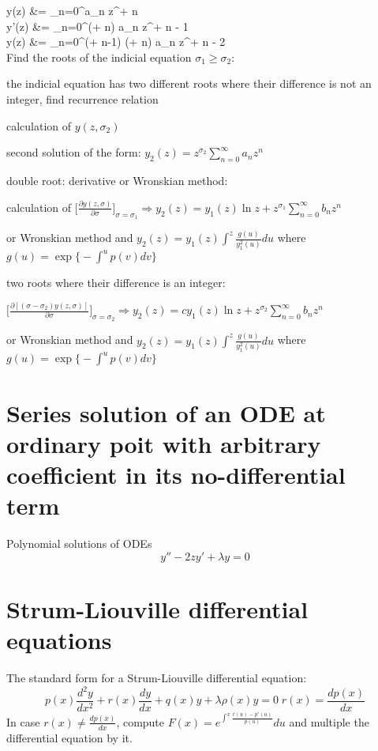\documentclass[12pt,twoside]{article}
\begin{document}
\ba
	y(z) &= \sum_{n=0}^\infty a_n z^{\sigma + n} \\
	y'(z) &= \sum_{n=0}^\infty (\sigma + n) a_n z^{\sigma + n - 1} \\
	y(z) &= \sum_{n=0}^\infty (\sigma + n-1) (\sigma + n) a_n z^{\sigma + n - 2} \\
\ea
Find the roots of the indicial equation $\sigma_1 \ge \sigma_2$:
\bi
	\item the indicial equation has two different roots where their difference is not an integer, find recurrence relation
	\bi
		\item calculation of $y(z, \sigma_2)$
		\item second solution of the form: $y_2(z) = z^{\sigma_2} \sum_{n=0}^{\infty} a_n z^n$
	\ei
	\item double root: derivative or Wronskian method: 
	\bi
		\item calculation of $\bigg [ \frac{\partial y(z,\sigma)}{ \partial \sigma} \bigg ]_{\sigma=\sigma_1} \Rightarrow y_2(z) = y_1(z) \ln z +  z^{\sigma_1} \sum_{n=0}^{\infty} b_n z^n$
		\item or Wronskian method and $y_2(z) = y_1(z) \int^z \frac{g(u)} {y_1^2(u)} du$ where $g(u) = \exp \big \{  - \int^u p(v) dv \big \}$
	\ei
	\item two roots where their difference is an integer: 
	\bi
		\item $\bigg [ \frac{\partial [ (\sigma - \sigma_2) y(z,\sigma) ]}{ \partial \sigma} \bigg ]_{\sigma=\sigma_2} \Rightarrow y_2(z) = c y_1(z) \ln z +  z^{\sigma_2} \sum_{n=0}^{\infty} b_n z^n $
		\item or Wronskian method and $y_2(z) = y_1(z) \int^z \frac{g(u)} {y_1^2(u)} du$ where $g(u) = \exp \big \{  - \int^u p(v) dv \big \}$
	\ei
\ei

\section{Series solution of an ODE at ordinary poit with arbitrary coefficient in its no-differential term}
Polynomial solutions of ODEs
\[
	y'' -2 z y' + \lambda y = 0
\]

\section{Strum-Liouville differential equations}
The standard form for a Strum-Liouville differential equation:
\[
	p(x) \frac{d^2y}{dx^2} + r(x) \frac{dy}{dx} + q(x) y + \lambda \rho(x) y = 0 \; r(x) = \frac{dp(x)}{dx}
\]
In case $r(x) \neq \frac{dp(x)}{dx}$, compute $F(x) = e^{\int^x \frac{r(u) -p'(u)}{p(u)}} du$ and multiple the differential equation by it.
\end{document}
